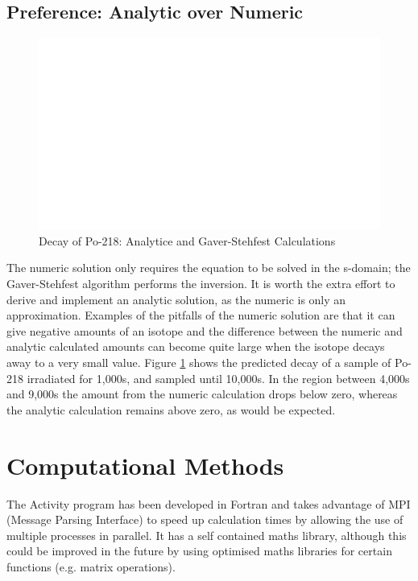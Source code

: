 \subsection{Preference: Analytic over Numeric}

\begin{figure}
	\begin{center}
		\includegraphics[width=15.0cm]{chapters/methodology_activity/plots/po-218/po218_po218.eps}
		\caption{Decay of Po-218: Analytice and Gaver-Stehfest Calculations \cite{jeff311}}
		\label{fig:po218decay}
	\end{center}
\end{figure}

The numeric solution only requires the equation to be solved in the s-domain; the Gaver-Stehfest algorithm performs the inversion.  It is worth the extra effort to derive and implement an analytic solution, as the numeric is only an approximation.  Examples of the pitfalls of the numeric solution are that it can give negative amounts of an isotope and the difference between the numeric and analytic calculated amounts can become quite large when the isotope decays away to a very small value.  Figure \ref{fig:po218decay} shows the predicted decay of a sample of Po-218 irradiated for 1,000s, and sampled until 10,000s.  In the region between 4,000s and 9,000s the amount from the numeric calculation drops below zero, whereas the analytic calculation remains above zero, as would be expected.



\section{Computational Methods}

The Activity program has been developed in Fortran and takes advantage of MPI (Message Parsing Interface) to speed up calculation times by allowing the use of multiple processes in parallel.  It has a self contained maths library, although this could be improved in the future by using optimised maths libraries for certain functions (e.g. matrix operations).

